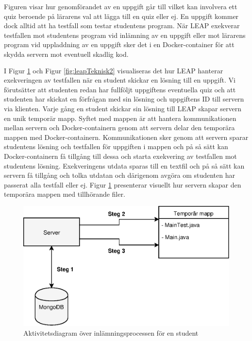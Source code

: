 \documentclass[a4paper,11pt]{article}
\begin{document}
{Figuren visar hur genomförandet av en uppgift går till vilket kan involvera ett quiz beroende på lärarens val att lägga till en quiz eller ej. En uppgift kommer dock alltid att ha testfall som testar studentens program. När LEAP exekverar testfallen mot studentens program vid inlämning av en uppgift eller mot lärarens program vid uppladdning av en uppgift sker det i en Docker-container för att skydda servern mot eventuell skadlig kod.

\newpage

I Figur \ref{fig:leapTeknisk1} och Figur \ref{fig:leapTeknisk2} visualiseras det hur LEAP hanterar exekveringen av testfallen när en student skickar en lösning till en uppgift. Vi förutsätter att studenten redan har fullföljt uppgiftens eventuella quiz och att studenten har skickat en förfrågan med sin lösning och uppgiftens ID till servern via klienten. Varje gång en student skickar sin lösning till LEAP skapar servern en unik temporär mapp. Syftet med mappen är att hantera kommunikationen mellan servern och Docker-containern genom att servern delar den temporära mappen med Docker-containern. Kommunikationen sker genom att servern sparar studentens lösning och testfallen för uppgiften i mappen och på så sätt kan Docker-containern få tillgång till dessa och starta exekvering av testfallen mot studentens lösning. Exekveringens utdata sparas till en textfil och på så sätt kan servern få tillgång och tolka utdatan och därigenom avgöra om studenten har passerat alla testfall eller ej. Figur \ref{fig:leapTeknisk1} presenterar visuellt hur servern skapar den temporära mappen med tillhörande filer.

\begin{figure}[ht!]
\centering
\includegraphics[scale=0.8]{leap_teknisk_1.eps}
\caption{Aktivitetsdiagram över inlämningsprocessen för en student}
\label{fig:leapTeknisk1}
\end{figure}

}
\end{document}
